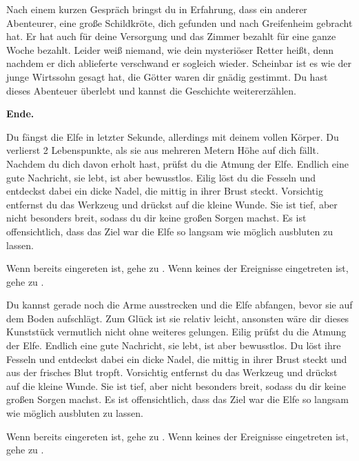 Nach einem kurzen Gespräch bringst du in Erfahrung, dass ein anderer Abenteurer, eine große Schildkröte, dich gefunden und nach Greifenheim gebracht hat. Er hat auch für deine Versorgung und das Zimmer bezahlt für eine ganze Woche bezahlt. Leider weiß niemand, wie dein mysteriöser Retter heißt, denn nachdem er dich ablieferte verschwand er sogleich wieder. Scheinbar ist es wie der junge Wirtssohn gesagt hat, die Götter waren dir gnädig gestimmt. Du hast dieses Abenteuer überlebt und kannst die Geschichte weitererzählen.

\textbf{Ende.}


Du fängst die Elfe in letzter Sekunde, allerdings mit deinem vollen Körper. Du verlierst 2 Lebenspunkte, als sie aus mehreren Metern Höhe auf dich fällt. Nachdem du dich davon erholt hast, prüfst du die Atmung der Elfe. Endlich eine gute Nachricht, sie lebt, ist aber bewusstlos. Eilig löst du die Fesseln und entdeckst dabei ein dicke Nadel, die mittig in ihrer Brust steckt. Vorsichtig entfernst du das Werkzeug  und drückst auf die kleine Wunde. Sie ist tief, aber nicht besonders breit, sodass du dir keine großen Sorgen machst. Es ist offensichtlich, dass das Ziel war die Elfe so langsam wie möglich ausbluten zu lassen.

Wenn  bereits eingereten ist, gehe zu . Wenn keines der Ereignisse eingetreten ist, gehe zu .


Du kannst gerade noch die Arme ausstrecken und die Elfe abfangen, bevor sie auf dem Boden aufschlägt. Zum Glück ist sie relativ leicht, ansonsten wäre dir dieses Kunststück vermutlich nicht ohne weiteres gelungen. Eilig prüfst du die Atmung der Elfe. Endlich eine gute Nachricht, sie lebt, ist aber bewusstlos. Du löst ihre Fesseln und entdeckst dabei ein dicke Nadel, die mittig in ihrer Brust steckt und aus der frisches Blut tropft. Vorsichtig entfernst du das Werkzeug  und drückst auf die kleine Wunde. Sie ist tief, aber nicht besonders breit, sodass du dir keine großen Sorgen machst. Es ist offensichtlich, dass das Ziel war die Elfe so langsam wie möglich ausbluten zu lassen.

Wenn  bereits eingereten ist, gehe zu . Wenn keines der Ereignisse eingetreten ist, gehe zu .

